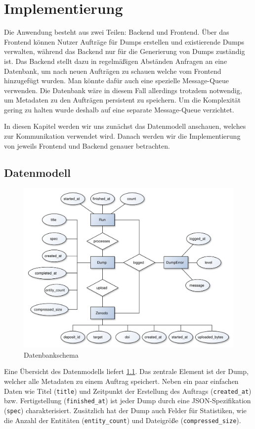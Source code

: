 \chapter{Implementierung}
Die Anwendung besteht aus zwei Teilen: Backend und Frontend. Über das Frontend können Nutzer Aufträge für Dumps erstellen und existierende Dumps verwalten, während das Backend nur für die Generierung von Dumps zuständig ist.
Das Backend stellt dazu in regelmäßigen Abständen Anfragen an eine Datenbank, um nach neuen Aufträgen zu schauen welche vom Frontend hinzugefügt wurden.
Man könnte dafür auch eine spezielle Message-Queue verwenden. Die Datenbank wäre in diesem Fall allerdings trotzdem notwendig, um Metadaten zu den Aufträgen persistent zu speichern. Um die Komplexität gering zu halten wurde deshalb auf eine separate Message-Queue verzichtet.

In diesen Kapitel werden wir uns zunächst das Datenmodell anschauen, welches zur Kommunikation verwendet wird.
Danach werden wir die Implementierung von jeweils Frontend und Backend genauer betrachten.

\section{Datenmodell}
\begin{figure}
  \includegraphics[width=\textwidth]{pics/db-er}
  \caption{Datenbankschema}
  \label{fig:db-er}
\end{figure}
Eine Übersicht des Datenmodells liefert \cref{fig:db-er}.
Das zentrale Element ist der Dump, welcher alle Metadaten zu einem Auftrag speichert.
Neben ein paar einfachen Daten wie Titel (\verb|title|) und Zeitpunkt der Erstellung des Auftrags (\verb|created_at|) bzw. Fertigstellung (\verb|finished_at|) ist jeder Dump durch eine JSON-Spezifikation (\verb|spec|) charakterisiert. Zusätzlich hat der Dump auch Felder für Statistiken, wie die Anzahl der Entitäten (\verb|entity_count|) und Dateigröße (\verb|compressed_size|).

